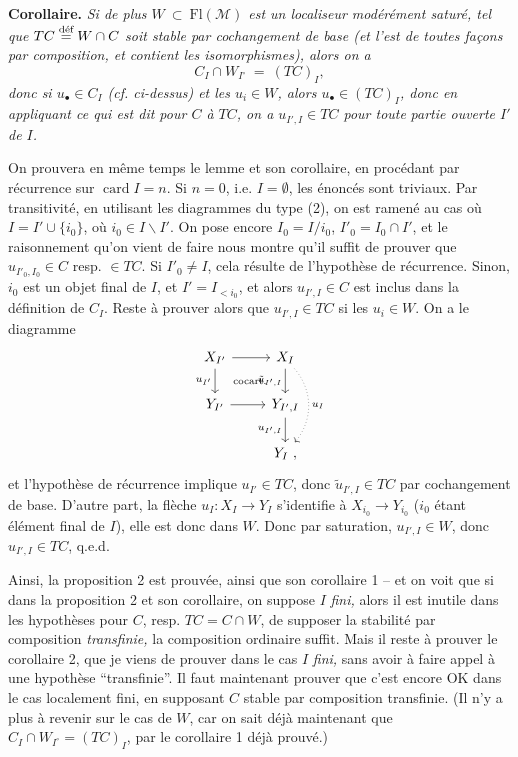 \documentclass[11pt]{article}
\newcommand{\printedpage}[1]{\marginpar{\footnotesize p.~#1}}
\newcommand{\msp}[1]{\marginpar{\footnotesize [#1]}}
\newcommand{\cocart}{\text{\scriptsize cocart.}}
\begin{document}
\textbf{Corollaire.} \textit{Si de plus $W \ \subset\ \mathrm{Fl}(\mathcal{M})$ est un localiseur modérément saturé, tel que $TC \overset{\textup{déf}}{=} W \cap C$ soit stable par cochangement de base (et l'est de toutes façons par composition, et contient les isomorphismes), alors on a}
\[
C_I \cap W_{I^\circ} \ = \ (TC)_I,
\]
\textit{donc si $u_\bullet \in C_I$ (cf. ci-dessus) et les $u_i \in W$, alors $u_\bullet \in (TC)_I$, donc en appliquant ce qui est dit pour $C$ à $TC$, on a $u_{I',I} \in TC$ pour toute} \msp{page 19} \textit{partie ouverte $I'$ de $I$.}

On prouvera en même temps le lemme et son corollaire, en procédant par récurrence sur $\operatorname{card} I = n$. Si $n = 0$, i.e. $I = \emptyset$, les énoncés sont triviaux. Par transitivité, en utilisant les diagrammes du type (2), on est ramené au cas où $I = I' \cup \{i_0\}$, où $i_0 \in I \backslash I'$. On pose encore $I_0 = I/i_0$, $I'_0 = I_0 \cap I'$, et le raisonnement qu'on vient de faire nous montre qu'il suffit de prouver que $u_{I'_0,I_0} \in C$ resp. $\in TC$. Si $I'_0 \neq I$, cela résulte de l'hypothèse de récurrence. %
Sinon, $i_0$ est un objet final de $I$, et $I' = I_{<i_0}$, et alors $u_{I',I} \in C$ est inclus dans la définition de $C_I$. Reste à prouver alors que $u_{I',I} \in TC$ si les $u_i \in W$. On a le diagramme
\printedpage{12}
\[
\begin{tikzcd}
X_{I'} \arrow[r] \arrow[d, "u_{I'}"'] \arrow[dr, phantom, "\cocart"] & X_I \arrow[d, "\tilde{u}_{I',I}"'] \arrow[dd, dotted, bend left=40, "u_I"] \\
Y_{I'} \arrow[r] & Y_{I',I} \arrow[d, "u_{I',I}"'] \\
 & Y_I\ ,
\end{tikzcd}
\]
\msp{page 20} et l'hypothèse de récurrence implique $u_{I'} \in TC$, donc $\tilde{u}_{I',I} \in TC$ par cochangement de base. D'autre part, la flèche $u_I : X_I \longrightarrow Y_I$ s'identifie à $X_{i_0} \longrightarrow Y_{i_0}$ ($i_0$ étant élément final de $I$), elle est donc dans $W$. Donc par saturation, $u_{I',I} \in W$, donc $u_{I',I} \in TC$, q.e.d.

Ainsi, la proposition 2 est prouvée, ainsi que son corollaire 1 -- et on voit que si dans la proposition 2 et son corollaire, on suppose $I$ \textit{fini,} alors il est inutile dans les hypothèses pour $C$, resp. $TC = C \cap W$, de supposer la stabilité par composition \textit{transfinie,} la composition ordinaire suffit. Mais il reste à prouver le corollaire 2, que je viens de prouver dans le cas $I$ \textit{fini,} sans avoir à faire appel à une hypothèse ``transfinie''. Il faut maintenant prouver que c'est encore OK dans le cas localement fini, en supposant $C$ stable par composition transfinie. (Il n'y a plus à revenir sur le cas de $W$, car on sait déjà maintenant que $C_I \cap W_{I^\circ} = (TC)_I$, par le corollaire 1 déjà prouvé.)
\end{document}
